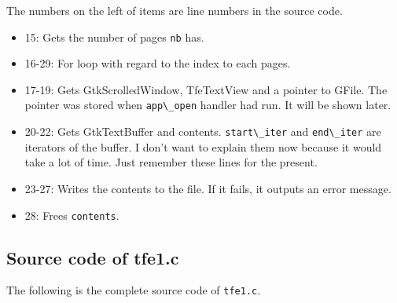 The numbers on the left of items are line numbers in the source code.

\begin{itemize}
\tightlist
\item
  15: Gets the number of pages \passthrough{\lstinline!nb!} has.
\item
  16-29: For loop with regard to the index to each pages.
\item
  17-19: Gets GtkScrolledWindow, TfeTextView and a pointer to GFile. The
  pointer was stored when \passthrough{\lstinline!app\_open!} handler
  had run. It will be shown later.
\item
  20-22: Gets GtkTextBuffer and contents.
  \passthrough{\lstinline!start\_iter!} and
  \passthrough{\lstinline!end\_iter!} are iterators of the buffer. I
  don't want to explain them now because it would take a lot of time.
  Just remember these lines for the present.
\item
  23-27: Writes the contents to the file. If it fails, it outputs an
  error message.
\item
  28: Frees \passthrough{\lstinline!contents!}.
\end{itemize}

\hypertarget{source-code-of-tfe1.c}{%
\subsection{Source code of tfe1.c}\label{source-code-of-tfe1.c}}

The following is the complete source code of
\passthrough{\lstinline!tfe1.c!}.

